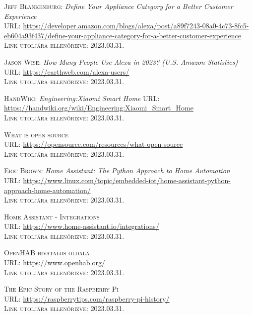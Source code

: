 \documentclass[
]{thesis-ekf}
\theoremstyle{definition}
\theoremstyle{remark}
\begin{document}
	\begin{thebibliography}{20}
		
		\textsc{Jeff Blankenburg}: \emph{Define Your Appliance Category for a Better Customer Experience}\\
		\textsc{URL:} \url{https://developer.amazon.com/blogs/alexa/post/a89f7243-08a0-4c73-8fc5-eb604a93f437/define-your-appliance-category-for-a-better-customer-experience}\\
		\textsc{Link utoljára ellenőrizve:} 2023.03.31.
		
		\textsc{Jason Wise}: \emph{How Many People Use Alexa in 2023? (U.S. Amazon Statistics)} \\
		\textsc{URL:} \url{https://earthweb.com/alexa-users/}\\
		\textsc{Link utoljára ellenőrizve:} 2023.03.31.
		
		\textsc{HandWiki}: \emph{Engineering:Xiaomi Smart Home}
		\textsc{URL:} \url{https://handwiki.org/wiki/Engineering:Xiaomi_Smart_Home}\\
		\textsc{Link utoljára ellenőrizve:} 2023.03.31.
		
		\textsc{What is open source}\\
		\textsc{URL:} \url{https://opensource.com/resources/what-open-source}\\
		\textsc{Link utoljára ellenőrizve:} 2023.03.31.
		
		\textsc{Eric Brown}: \emph{Home Assistant: The Python Approach to Home Automation}\\
		\textsc{URL:} \url{https://www.linux.com/topic/embedded-iot/home-assistant-python-approach-home-automation/}\\
		\textsc{Link utoljára ellenőrizve:} 2023.03.31.
		
		\textsc{Home Assistant - Integrations}\\
		\textsc{URL:} \url{https://www.home-assistant.io/integrations/}\\
		\textsc{Link utoljára ellenőrizve:} 2023.03.31.
		
		\textsc{OpenHAB hivatalos oldala}\\
		\textsc{URL:} \url{https://www.openhab.org/}\\
		\textsc{Link utoljára ellenőrizve:} 2023.03.31.
		
		\textsc{The Epic Story of the Raspberry Pi}\\
		\textsc{URL:} \url{https://raspberrytips.com/raspberry-pi-history/}\\
		\textsc{Link utoljára ellenőrizve:} 2023.03.31.
		

\end{thebibliography}
\end{document}
